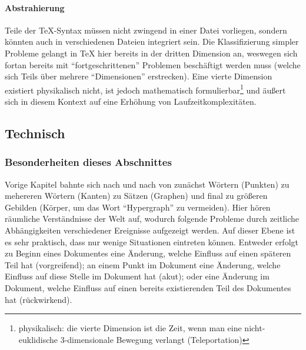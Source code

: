 \paragraph*{Abstrahierung}%
Teile der \TeX-Syntax müssen nicht zwingend in einer Datei vorliegen, sondern könnten auch in verschiedenen Dateien integriert sein. Die Klassifizierung simpler Probleme gelangt in \TeX{} hier bereits in der dritten Dimension an, weswegen sich fortan bereits mit \enquote{fortgeschrittenen} Problemen beschäftigt werden muss (welche sich Teils über mehrere \enquote{Dimensionen} erstrecken). Eine vierte Dimension existiert physikalisch nicht, ist jedoch mathematisch formulierbar\footnote{physikalisch: die vierte Dimension ist die Zeit, wenn man eine nicht-euklidische 3-dimensionale Bewegung verlangt (Teleportation)} und äußert sich in diesem Kontext auf eine Erhöhung von Laufzeitkomplexitäten.





\subsection{Technisch}\label{problems:advanced}
\subsubsection{Besonderheiten dieses Abschnittes}
Vorige Kapitel bahnte sich nach und nach von zunächst Wörtern (Punkten) zu mehereren Wörtern (Kanten) zu Sätzen (Graphen) und final zu größeren Gebilden (Körper, um das Wort \enquote{Hypergraph} zu vermeiden). Hier hören räumliche Verständnisse der Welt auf, wodurch folgende Probleme durch zeitliche Abhängigkeiten verschiedener Ereignisse aufgezeigt werden. Auf dieser Ebene ist es sehr praktisch, dass nur wenige Situationen eintreten können. Entweder erfolgt zu Beginn eines Dokumentes eine Änderung, welche Einfluss auf einen späteren Teil hat (vorgreifend); an einem Punkt im Dokument eine Änderung, welche Einfluss auf diese Stelle im Dokument hat (akut); oder eine Änderung im Dokument, welche Einfluss auf einen bereits existierenden Teil des Dokumentes hat (rückwirkend).%

